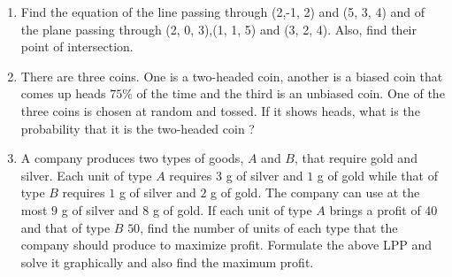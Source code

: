 \documentclass[12pt,letterpaper]{article}
\begin{document}
\begin{enumerate}
\item Find the equation of the line passing through (2,-1, 2) and (5, 3, 4) and of the plane passing through 
(2, 0, 3),(1, 1, 5) and (3, 2, 4). 
Also, find their point of intersection.
\item There are three coins. One is a two-headed coin, another is a biased coin that comes up heads $75\%$ of the time and the third is an unbiased coin. One of the three coins is chosen at random and tossed. If it shows heads, what is the probability that it is the two-headed coin ?
\item A company produces two types of goods, $A$ and $B$, that require gold and silver. Each unit of type $A$ requires $3$ g of silver and $1$ g of gold while that of type $B$ requires $1$ g of silver and $2$ g of gold. The company can use at the most $9$ g of silver and $8$ g of gold. If each unit of type $A$ brings a profit of \rupee $40$ and that of type $B$ \rupee $50$, find the number of units of each type that the company should produce to maximize profit. Formulate the above LPP and solve it graphically and also find the maximum profit.

\end{enumerate}
\end{document}

